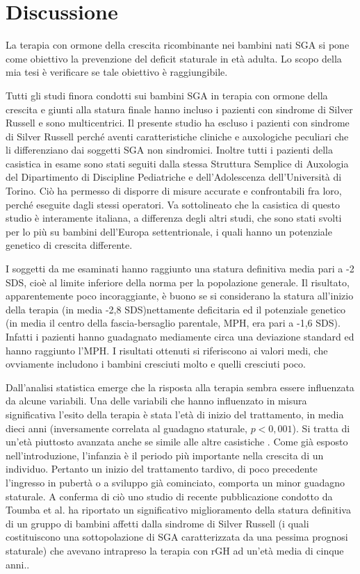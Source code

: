 \chapter{Discussione}

La terapia con ormone della crescita ricombinante nei bambini nati SGA si pone come obiettivo la prevenzione del deficit staturale in età adulta.
Lo scopo della mia tesi è verificare se tale obiettivo è raggiungibile.

Tutti gli studi finora condotti sui bambini SGA in terapia con ormone della crescita e giunti alla statura finale hanno incluso i pazienti con sindrome di Silver Russell e sono multicentrici. Il presente studio ha escluso i pazienti con sindrome di Silver Russell perché aventi caratteristiche cliniche e auxologiche peculiari che li differenziano dai soggetti SGA non sindromici. Inoltre tutti i pazienti della casistica in esame sono stati seguiti dalla stessa Struttura Semplice di Auxologia del Dipartimento di Discipline Pediatriche e dell'Adolescenza dell'Università  di Torino. Ciò ha permesso di disporre di misure accurate e confrontabili fra loro, perché eseguite dagli stessi operatori. Va sottolineato che la casistica di questo studio è interamente italiana, a differenza degli altri studi, che sono stati svolti per lo più su bambini dell'Europa settentrionale, i quali hanno un potenziale genetico di crescita differente.

I soggetti da me esaminati hanno raggiunto una statura definitiva media pari a -2 SDS, cioè al limite inferiore della norma per la popolazione generale. Il risultato, apparentemente poco incoraggiante, è buono se si considerano la statura all'inizio della terapia (in media -2,8 SDS)nettamente deficitaria ed il potenziale genetico (in media il centro della fascia-bersaglio parentale, MPH, era pari a -1,6 SDS). Infatti i pazienti hanno guadagnato mediamente circa una deviazione standard ed hanno raggiunto l'MPH. I risultati ottenuti si riferiscono ai valori medi, che ovviamente includono i bambini cresciuti molto e quelli cresciuti poco. 

Dall'analisi statistica emerge che la risposta alla terapia sembra essere influenzata da alcune variabili.
Una delle variabili che hanno influenzato in misura significativa l'esito della terapia è stata l'età di inizio del trattamento, in media dieci anni (inversamente correlata al guadagno staturale, $p < 0,001$). Si tratta di un'età piuttosto avanzata anche se simile alle altre casistiche\cite{coutant1998short} \cite{zucchini2001final}. Come già esposto nell'introduzione, l'infanzia è il periodo più importante nella crescita di un individuo. Pertanto un inizio del trattamento tardivo, di poco precedente l'ingresso in pubertà o a sviluppo già cominciato, comporta un minor guadagno staturale. A conferma di ciò uno studio di recente pubblicazione condotto da Toumba et al. ha riportato un significativo miglioramento della statura definitiva di un gruppo di bambini affetti dalla sindrome di Silver Russell (i quali costituiscono una sottopolazione di SGA caratterizzata da una pessima prognosi staturale) che avevano intrapreso la terapia con rGH ad un'età media di cinque anni.\cite{toumba2010effect}. 

